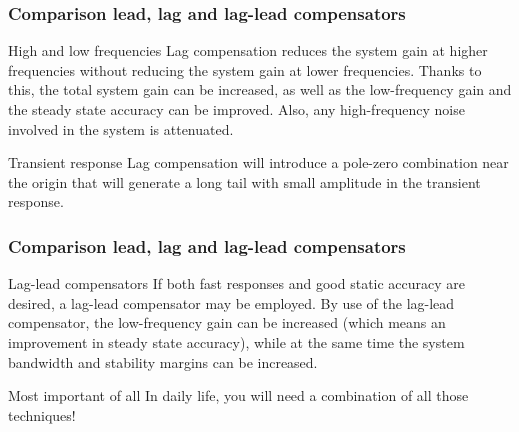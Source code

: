 \begin{frame}
	\frametitle{Comparison lead, lag and lag-lead compensators}
\begin{block}{High and low frequencies}
Lag compensation reduces the system gain at higher frequencies without reducing
the system gain at lower frequencies. 
Thanks to this, the total system gain can be increased, as well as the low-frequency gain and the steady state accuracy can be improved. Also, any high-frequency
noise involved in the system is attenuated.
\end{block}
\begin{block}{Transient response}
Lag compensation will introduce a pole-zero combination near the origin that will
generate a long tail with small amplitude in the transient response.
\end{block}
\end{frame}

\begin{frame}
\frametitle{Comparison lead, lag and lag-lead compensators}
\begin{block}{Lag-lead compensators}
If both fast responses and good static accuracy are desired, a lag-lead compensator
may be employed. By use of the lag-lead compensator, the low-frequency gain can
be increased (which means an improvement in steady state accuracy), while at the
same time the system bandwidth and stability margins can be increased.
\end{block}
\begin{block}{Most important of all}
In daily life, you will need a combination of all those techniques!
\end{block}
\end{frame}






